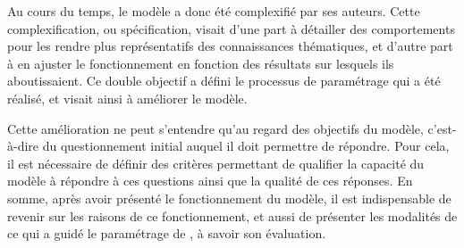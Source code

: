 Au cours du temps, le modèle a donc été complexifié par ses auteurs.
Cette complexification, ou spécification, visait d'une part à détailler des comportements pour les rendre plus représentatifs des connaissances thématiques, et d'autre part à en ajuster le fonctionnement en fonction des résultats sur lesquels ils aboutissaient.
Ce double objectif a défini le processus de \og paramétrage\fg{} qui a été réalisé, et visait ainsi à \og améliorer\fg{} le modèle.

Cette \og amélioration\fg{} ne peut s'entendre qu'au regard des objectifs du modèle, c'est-à-dire du questionnement initial auquel il doit permettre de répondre.
Pour cela, il est nécessaire de définir des critères permettant de qualifier la capacité du modèle à répondre à ces questions ainsi que la qualité de ces réponses.
En somme, après avoir présenté le fonctionnement du modèle, il est indispensable de revenir sur les raisons de ce fonctionnement, et aussi de présenter les modalités de ce qui a guidé le paramétrage de \simfeodal{}, à savoir son évaluation.
